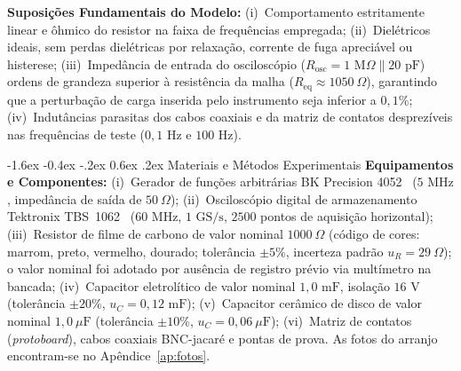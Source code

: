 \documentclass[12pt, a4paper]{article}
\makeatletter
\renewcommand\section{\@startsection {section}{1}{\z@}%
                                   {-1.6ex \@plus -0.4ex \@minus -.2ex}%
                                   {0.6ex \@plus .2ex}%
                                   {\normalfont\large\bfseries}}
\makeatother
\begin{document}
\noindent\textbf{Suposições Fundamentais do Modelo:}
(i)~Comportamento estritamente linear e ôhmico do resistor na faixa de frequências empregada;
(ii)~Dielétricos ideais, sem perdas dielétricas por relaxação, corrente de fuga apreciável ou histerese;
(iii)~Impedância de entrada do osciloscópio ($R_{\text{osc}} = 1\text{ M}\Omega \parallel 20\text{ pF}$) ordens de grandeza superior à resistência da malha ($R_{\text{eq}} \approx 1050\ \Omega$), garantindo que a perturbação de carga inserida pelo instrumento seja inferior a $0{,}1\%$;
(iv)~Indutâncias parasitas dos cabos coaxiais e da matriz de contatos desprezíveis nas frequências de teste ($0{,}1\text{ Hz}$ e $100\text{ Hz}$).

\vspace{-0.25cm}
\section{Materiais e Métodos Experimentais}
\vspace{-0.15cm}
\noindent\textbf{Equipamentos e Componentes:}
(i)~Gerador de funções arbitrárias BK Precision 4052~\cite{bkprecision} ($5\text{ MHz}$, impedância de saída de $50\ \Omega$);
(ii)~Osciloscópio digital de armazenamento Tektronix TBS~1062~\cite{tektronix} ($60\text{ MHz}$, $1\text{ GS/s}$, $2500$ pontos de aquisição horizontal);
(iii)~Resistor de filme de carbono de valor nominal $1000\ \Omega$ (código de cores: marrom, preto, vermelho, dourado; tolerância $\pm 5\%$, incerteza padrão $u_R = 29\ \Omega$); o valor nominal foi adotado por ausência de registro prévio via multímetro na bancada;
(iv)~Capacitor eletrolítico de valor nominal $1{,}0\text{ mF}$, isolação $16\text{ V}$ (tolerância $\pm 20\%$, $u_C = 0{,}12\text{ mF}$);
(v)~Capacitor cerâmico de disco de valor nominal $1{,}0\ \mu\text{F}$ (tolerância $\pm 10\%$, $u_C = 0{,}06\ \mu\text{F}$);
(vi)~Matriz de contatos (\textit{protoboard}), cabos coaxiais BNC-jacaré e pontas de prova. As fotos do arranjo encontram-se no Apêndice~\ref{ap:fotos}.
\end{document}

